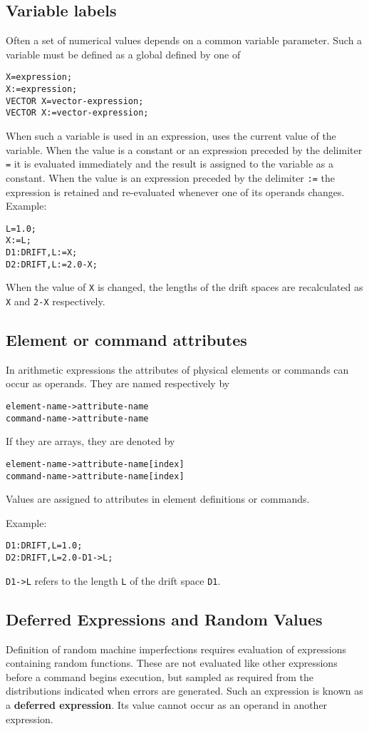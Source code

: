 \subsection{Variable labels}
\label{sec:avariable}
Often a set of numerical values depends
on a common variable parameter.
Such a variable must be defined as a global 
 defined by one of 
\begin{verbatim}
X=expression;
X:=expression;
VECTOR X=vector-expression;
VECTOR X:=vector-expression;
\end{verbatim}
When such a variable is used in an expression,
\opal uses the current value of the variable.
When the value is a constant or an expression preceded by the delimiter
\texttt{=} it is evaluated immediately and the result is assigned to the
variable as a constant. 
When the value is an expression preceded by the delimiter \texttt{:=}
the expression is retained and re-evaluated whenever one of its operands
changes. 
\noindent Example:
\begin{verbatim}
L=1.0;
X:=L;
D1:DRIFT,L:=X;
D2:DRIFT,L:=2.0-X;
\end{verbatim}
When the value of \texttt{X} is changed,
the lengths of the drift spaces are recalculated as
\texttt{X} and \texttt{2-X} respectively.

\subsection{Element or command attributes}
In arithmetic expressions the attributes of physical elements
or commands can occur as operands.
They are named respectively by
\begin{verbatim}
element-name->attribute-name
command-name->attribute-name
\end{verbatim}
If they are arrays, they are denoted by
\begin{verbatim}
element-name->attribute-name[index]
command-name->attribute-name[index]
\end{verbatim}
Values are assigned to attributes in element definitions or commands.

\noindent Example:
\begin{verbatim}
D1:DRIFT,L=1.0;
D2:DRIFT,L=2.0-D1->L;
\end{verbatim}
\texttt{D1->L} refers to the length \texttt{L} of the drift space \texttt{D1}.

\subsection{Deferred Expressions and Random Values}
\label{sec:adefer}
Definition of random machine imperfections requires evaluation
of expressions containing random functions.
These are not evaluated like other expressions before a command
begins execution, but sampled as required from the distributions
indicated when errors are generated.
Such an expression is known as a \textbf{deferred expression}.
Its value cannot occur as an operand in another expression.

